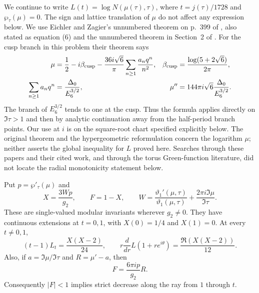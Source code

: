 We continue to write $L(t)=\log N(\mu(\tau),\tau)$, where
$t=j(\tau)/1728$ and $\wp_\tau(\mu)=0$. The sign and lattice
translation of $\mu$ do not affect any expression below. We use
Eichler and Zagier's unnumbered theorem on p.~399 of
\cite{EichlerZagier1982}, also stated as equation (6) and the
unnumbered theorem in Section~2 of \cite{DukeImamoglu2008}.
For the cusp branch in this problem their theorem says
\begin{equation}\label{ari:eq:cc-EZ}
 \begin{aligned}
 \mu&=\frac12-i\beta_{\rm cusp}-
       \frac{36i\sqrt6}{\pi}\sum_{n\ge1}\frac{a_nq^n}{n^2},
 &\beta_{\rm cusp}&=\frac{\log(5+2\sqrt6)}{2\pi},\\
 \sum_{n\ge1}a_nq^n&=\frac{\Delta_0}{E_6^{3/2}},
 &\mu''&=144\pi i\sqrt6\frac{\Delta_0}{E_6^{3/2}}.
 \end{aligned}
\end{equation}
The branch of $E_6^{3/2}$ tends to one at the cusp. Thus the
formula applies directly on $\Im\tau>1$ and then by analytic
continuation away from the half-period branch points. Our use at $i$ is on the square-root chart specified explicitly below.
The original theorem and the hypergeometric reformulation concern
the logarithm $\mu$; neither asserts the global inequality for
$L$ proved here. Searches through these papers and their cited
work, and through the torus Green-function literature, did not
locate the radial monotonicity statement below.

\begin{proposition}\label{ari:C.8.12}
Put $p=\wp'_\tau(\mu)$ and
\[
 X=\frac{3Wp}{g_2},\qquad F=1-X,
 \qquad W=\frac{\vartheta_1'(\mu,\tau)}{\vartheta_1(\mu,\tau)}
              +\frac{2\pi i\Im\mu}{\Im\tau}.
\]
These are single-valued modular invariants wherever $g_2\ne0$.
They have continuous extensions at $t=0,1$, with
$X(0)=1/4$ and $X(1)=0$. At every $t\ne0,1$,
\begin{equation}\label{ari:eq:cc-radial}
 (t-1)L_t=\frac{X(X-2)}{24},\qquad
 r\frac{d}{dr}L(1+re^{i\theta})
       =\frac{\Re(X(X-2))}{12}.
\end{equation}
Also, if $a=\Im\mu/\Im\tau$ and $R=\mu'-a$, then
\begin{equation}\label{ari:eq:cc-FR}
 F=\frac{6\pi ip}{g_2}R.
\end{equation}
Consequently $|F|<1$ implies strict decrease along the ray
from $1$ through $t$.
\end{proposition}

